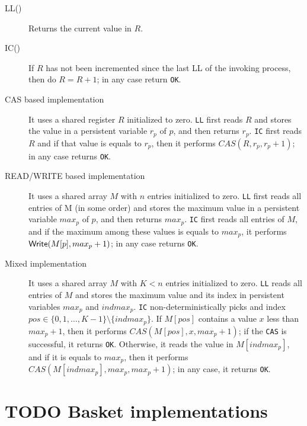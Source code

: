 \documentclass{latex/classes/thesis}
\begin{document}
\begin{description}
\item[{LL()}] Returns the current value in \(R\).
\item[{IC()}] If \(R\) has not been incremented since the last LL of the
invoking process, then do \(R = R + 1\); in any case return \texttt{OK}.

\item[{CAS based implementation}] It uses a shared register \(R\) initialized to
zero. \texttt{LL} first reads \(R\) and stores the value in a persistent variable
\(r_p\) of \(p\), and then returns \(r_p\). \texttt{IC} first reads \(R\) and if
that value is equals to \(r_p\), then it performs \(CAS(R, r_p, r_p +
     1)\); in any case returns \texttt{OK}.
\item[{READ/WRITE based implementation}] It uses a shared array \(M\) with \(n\)
entries initialized to zero. \texttt{LL} first reads all entries of M (in some
order) and stores the maximum value in a persistent variable \(max_p\) of
\(p\), and then returns \(max_p\). \texttt{IC} first reads all entries of \(M\),
and if the maximum among these values is equals to \(max_p\), it performs
\({\sf \small Write}(M[p], max_p + 1)\); in any case returns \texttt{OK}.
\item[{Mixed implementation}] It uses a shared array \(M\) with \(K < n\)
entries initialized to zero. \texttt{LL} reads all entries of \(M\) and stores the
maximum value and its index in persistent variables \(max_p\) and
\(indmax_p\). \texttt{IC} non-deterministically picks and index \(pos \in \{0, 1,
     \ldots, K - 1\} \setminus \{indmax_p\}\). If \(M[pos]\) contains a value
\(x\) less than \(max_p + 1\), then it performs \(CAS(M[pos], x, max_p +
     1)\); if the \texttt{CAS} is successful, it returns \texttt{OK}. Otherwise, it reads the
value in \(M[indmax_p]\), and if it is equals to \(max_p\), then it
performs \(CAS(M[indmax_p], max_p, max_p + 1)\); in any case, it returns
\texttt{OK}.
\end{description}


\section{{\bfseries\sffamily TODO} Basket implementations}
\label{sec:orgef62db5}
\end{document}
